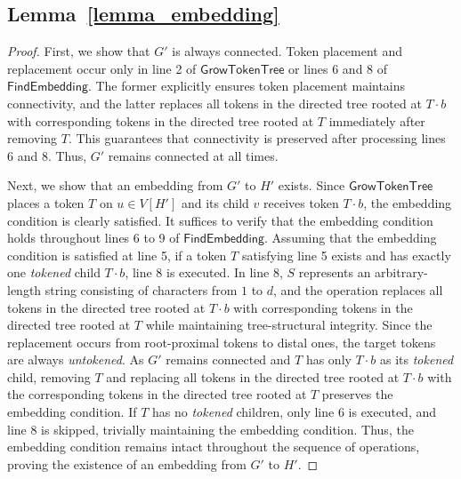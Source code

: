 \documentclass[runningheads]{llncs}
\theoremstyle{plain}
\theoremstyle{definition}
\begin{document}
\subsection{\textbf{Lemma~\ref{lemma_embedding}}}
\begin{proof}
    First, we show that $G'$ is always connected. Token placement and replacement occur only in line 2 of $\mathsf{GrowTokenTree}$ or lines 6 and 8 of $\mathsf{FindEmbedding}$. The former explicitly ensures token placement maintains connectivity, and the latter replaces all tokens in the directed tree rooted at $T \cdot b$ with corresponding tokens in the directed tree rooted at $T$ immediately after removing $T$. This guarantees that connectivity is preserved after processing lines 6 and 8. Thus, $G'$ remains connected at all times.

    Next, we show that an embedding from $G'$ to $H'$ exists. Since $\mathsf{GrowTokenTree}$ places a token $T$ on $u \in V[H']$ and its child $v$ receives token $T \cdot b$, the embedding condition is clearly satisfied. It suffices to verify that the embedding condition holds throughout lines 6 to 9 of $\mathsf{FindEmbedding}$. Assuming that the embedding condition is satisfied at line 5, if a token $T$ satisfying line 5 exists and has exactly one \textit{tokened} child $T \cdot b$, line 8 is executed. In line 8, $S$ represents an arbitrary-length string consisting of characters from $1$ to $d$, and the operation replaces all tokens in the directed tree rooted at $T \cdot b$ with corresponding tokens in the directed tree rooted at $T$ while maintaining tree-structural integrity. Since the replacement occurs from root-proximal tokens to distal ones, the target tokens are always \textit{untokened}. As $G'$ remains connected and $T$ has only $T \cdot b$ as its \textit{tokened} child, removing $T$ and replacing all tokens in the directed tree rooted at $T \cdot b$ with the corresponding tokens in the directed tree rooted at $T$ preserves the embedding condition. If $T$ has no \textit{tokened} children, only line 6 is executed, and line 8 is skipped, trivially maintaining the embedding condition. Thus, the embedding condition remains intact throughout the sequence of operations, proving the existence of an embedding from $G'$ to $H'$.
\end{proof}
\end{document}

